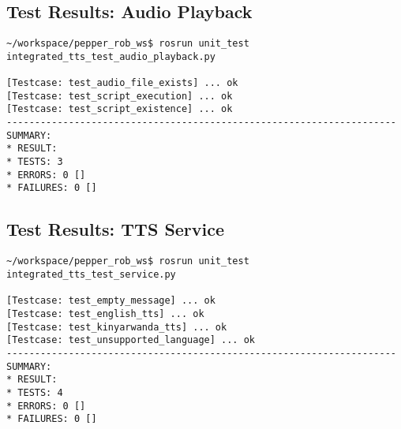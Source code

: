 \documentclass{CSSRforAfrica}
\begin{document}
\subsection{Test Results: Audio Playback}
\begin{lstlisting}[style=commandstyle]
~/workspace/pepper_rob_ws$ rosrun unit_test integrated_tts_test_audio_playback.py

[Testcase: test_audio_file_exists] ... ok
[Testcase: test_script_execution] ... ok
[Testcase: test_script_existence] ... ok
---------------------------------------------------------------------
SUMMARY:
* RESULT: 
* TESTS: 3
* ERRORS: 0 []
* FAILURES: 0 []
\end{lstlisting}

\subsection{Test Results: TTS Service}
\begin{lstlisting}[style=commandstyle]
~/workspace/pepper_rob_ws$ rosrun unit_test integrated_tts_test_service.py

[Testcase: test_empty_message] ... ok
[Testcase: test_english_tts] ... ok
[Testcase: test_kinyarwanda_tts] ... ok
[Testcase: test_unsupported_language] ... ok
---------------------------------------------------------------------
SUMMARY:
* RESULT: 
* TESTS: 4
* ERRORS: 0 []
* FAILURES: 0 []
\end{lstlisting}
\end{document}
